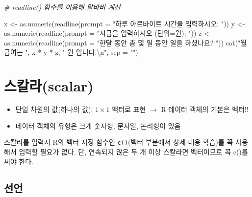 \documentclass[
  11pt,
]{krantz}
\makeatletter
\newenvironment{Shaded}{\begin{snugshade}}{\end{snugshade}}
\newcommand{\AttributeTok}[1]{\textcolor[rgb]{0.61,0.61,0.61}{#1}}
\newcommand{\CommentTok}[1]{\textcolor[rgb]{0.37,0.37,0.37}{\textit{#1}}}
\newcommand{\FunctionTok}[1]{\textcolor[rgb]{0,0,0}{#1}}
\newcommand{\NormalTok}[1]{#1}
\newcommand{\OtherTok}[1]{\textcolor[rgb]{0.37,0.37,0.37}{#1}}
\newcommand{\SpecialCharTok}[1]{\textcolor[rgb]{0,0,0}{#1}}
\newcommand{\StringTok}[1]{\textcolor[rgb]{0.5,0.5,0.5}{#1}}
\providecommand{\tightlist}{%
  \setlength{\itemsep}{0pt}\setlength{\parskip}{0pt}}
\newenvironment{kframe}{%
\medskip{}
\setlength{\fboxsep}{.8em}
 \def\at@end@of@kframe{}%
 \ifinner\ifhmode%
  \def\at@end@of@kframe{\end{minipage}}%
  \begin{minipage}{\columnwidth}%
 \fi\fi%
 \def\FrameCommand##1{\hskip\@totalleftmargin \hskip-\fboxsep
 \colorbox{shadecolor}{##1}\hskip-\fboxsep
     \hskip-\linewidth \hskip-\@totalleftmargin \hskip\columnwidth}%
 \MakeFramed {\advance\hsize-\width
   \@totalleftmargin\z@ \linewidth\hsize
   \@setminipage}}%
 {\par\unskip\endMakeFramed%
 \at@end@of@kframe}
\newenvironment{rmdblock}[1]
  {
  \begin{itemize}
  \renewcommand{\labelitemi}{
    \raisebox{-.7\height}[0pt][0pt]{
      {\setkeys{Gin}{width=3em,keepaspectratio}\texttt{[image: images/\#1]}}
    }
  }
  \setlength{\fboxsep}{1em}
  \begin{kframe}
  \item
  }
  {
  \end{kframe}
  \end{itemize}
  }
\newenvironment{rmdtip}
  {\begin{rmdblock}{tip}}
  {\end{rmdblock}}
\makeatother
\begin{document}
\normalsize

\footnotesize

\begin{Shaded}
\begin{Highlighting}[]
\CommentTok{\# readline() 함수를 이용해 알바비 계산}

\NormalTok{x }\OtherTok{\textless{}{-}} \FunctionTok{as.numeric}\NormalTok{(}\FunctionTok{readline}\NormalTok{(}\AttributeTok{prompt =} \StringTok{"하루 아르바이트 시간을 입력하시오: "}\NormalTok{))}
\NormalTok{y }\OtherTok{\textless{}{-}} \FunctionTok{as.numeric}\NormalTok{(}\FunctionTok{readline}\NormalTok{(}\AttributeTok{prompt =} \StringTok{"시급을 입력하시오 (단위=원): "}\NormalTok{))}
\NormalTok{z }\OtherTok{\textless{}{-}} \FunctionTok{as.numeric}\NormalTok{(}\FunctionTok{readline}\NormalTok{(}\AttributeTok{prompt =} \StringTok{"한달 동안 총 몇 일 동안 일을 하셨나요? "}\NormalTok{))}
\FunctionTok{cat}\NormalTok{(}\StringTok{"월 급여는 "}\NormalTok{, x }\SpecialCharTok{*}\NormalTok{ y }\SpecialCharTok{*}\NormalTok{ z, }\StringTok{" 원 입니다.}\SpecialCharTok{\textbackslash{}n}\StringTok{"}\NormalTok{, }\AttributeTok{sep =} \StringTok{""}\NormalTok{)}
\end{Highlighting}
\end{Shaded}

\normalsize

\hypertarget{scalar}{%
\section{스칼라(scalar)}\label{scalar}}

\begin{itemize}
\tightlist
\item
  단일 차원의 값(하나의 값): \(1 \times 1\) 백터로 표현 \(\rightarrow\) R 데이터 객체의 기본은 벡터!!
\item
  데이터 객체의 유형은 크게 숫자형, 문자열, 논리형이 있음
\end{itemize}

\footnotesize

\begin{rmdtip}
스칼라를 입력시 R의 벡터 지정 함수인 \texttt{c()}(벡터 부분에서 상세 내용 학습)를 꼭 사용해서 입력할 필요가 없다. 단, 연속되지 않은 두 개 이상 스칼라면 벡터이므로 꼭 c()를 써야 한다.
\end{rmdtip}

\normalsize

\hypertarget{definition}{%
\subsection{선언}\label{definition}}
\end{document}

